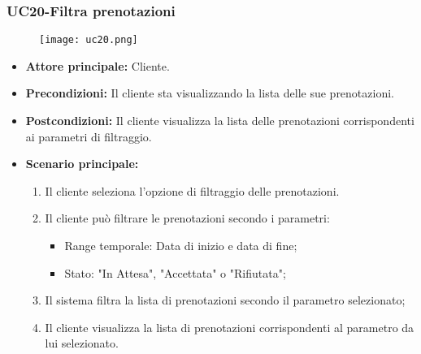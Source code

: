 \subsubsection{UC20-Filtra prenotazioni}
\begin{figure}[h] \texttt{[image: uc20.png]} \end{figure}
\begin{itemize}
\item \textbf{Attore principale:} Cliente.
\item \textbf{Precondizioni:} Il cliente sta visualizzando la lista delle sue prenotazioni.
\item \textbf{Postcondizioni:} Il cliente visualizza la lista delle prenotazioni corrispondenti ai parametri di filtraggio.
\item \textbf{Scenario principale:}
\begin{enumerate}
    \item Il cliente seleziona l'opzione di filtraggio delle prenotazioni.
    \item Il cliente può filtrare le prenotazioni secondo i parametri:
              \begin{itemize}
                \item Range temporale: Data di inizio e data di fine;
                \item Stato: "In Attesa", "Accettata" o "Rifiutata";
              \end{itemize}
    \item Il sistema filtra la lista di prenotazioni secondo il parametro selezionato;
    \item Il cliente visualizza la lista di prenotazioni corrispondenti al parametro da lui selezionato. 
\end{enumerate}
\end{itemize}

